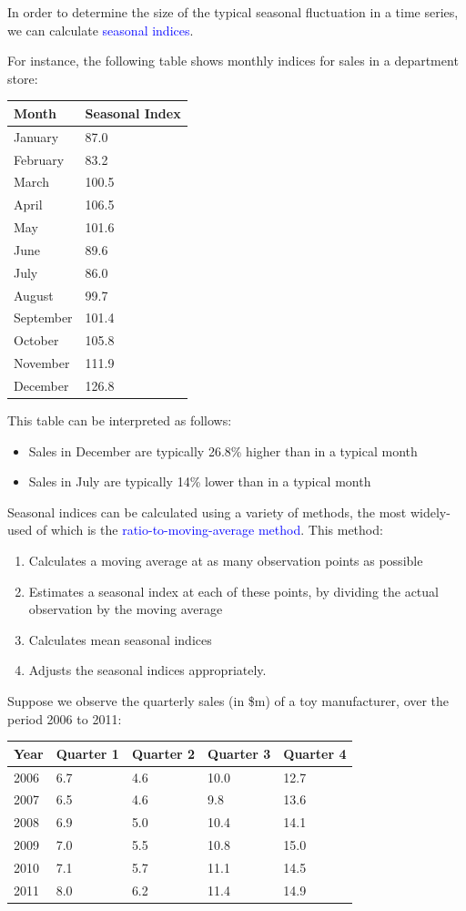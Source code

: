 \documentclass[12pt,a4paper,openany,twoside]{report}
\newcommand{\blue}{\textcolor{blue}}
\newcommand{\emphx}[1]{\blue{#1}}
\theoremstyle{definition}
\theoremstyle{remark}
\theoremstyle{plain}
\newcommand{\vsps}{\vspace{.5cm}}
\theoremstyle{definition}
\theoremstyle{definition}
\theoremstyle{definition}
\theoremstyle{remark}
\let\BeginKnitrBlock\begin \let\EndKnitrBlock\end
\begin{document}
In order to determine the size of the typical seasonal fluctuation in a
time series, we can calculate \emphx{seasonal indices}.

For instance, the following table shows monthly indices for
sales in a department store:

\begin{longtable}[c]{@{}ll@{}}
\toprule
Month & Seasonal Index\tabularnewline
\midrule
\endhead
January & 87.0\tabularnewline
February & 83.2\tabularnewline
March & 100.5\tabularnewline
April & 106.5\tabularnewline
May & 101.6\tabularnewline
June & 89.6\tabularnewline
July & 86.0\tabularnewline
August & 99.7\tabularnewline
September & 101.4\tabularnewline
October & 105.8\tabularnewline
November & 111.9\tabularnewline
December & 126.8\tabularnewline
\bottomrule
\end{longtable}

This table can be interpreted as follows:

\begin{itemize}
\item
  Sales in December are typically 26.8\% higher than in a typical month
\item
  Sales in July are typically 14\% lower than in a typical month
\end{itemize}

Seasonal indices can be calculated using a variety of methods, the most
widely-used of which is the \emphx{ratio-to-moving-average method}.
This method:

\begin{enumerate}
\def\labelenumi{\arabic{enumi})}
\item
  Calculates a moving average at as many observation points as possible
\item
  Estimates a seasonal index at each of these points, by dividing the
  actual observation by the moving average
\item
  Calculates mean seasonal indices
\item
  Adjusts the seasonal indices appropriately.
  \vsps
\end{enumerate}

\BeginKnitrBlock{example}[Toy sales]
\protect\hypertarget{exm:lind}{}{\label{exm:lind} {} }Suppose we observe the quarterly sales (in \$m) of a toy manufacturer,
over the period 2006 to 2011:\newline

\begin{longtable}[c]{@{}lllll@{}}
\toprule
Year & Quarter 1 & Quarter 2 &
Quarter 3 & Quarter 4\tabularnewline
\midrule
\endhead
2006 & 6.7 & 4.6 & 10.0 & 12.7\tabularnewline
2007 & 6.5 & 4.6 & 9.8 & 13.6\tabularnewline
2008 & 6.9 & 5.0 & 10.4 & 14.1\tabularnewline
2009 & 7.0 & 5.5 & 10.8 & 15.0\tabularnewline
2010 & 7.1 & 5.7 & 11.1 & 14.5\tabularnewline
2011 & 8.0 & 6.2 & 11.4 & 14.9\tabularnewline
\bottomrule
\end{longtable}
\EndKnitrBlock{example}
\vsps
\end{document}
